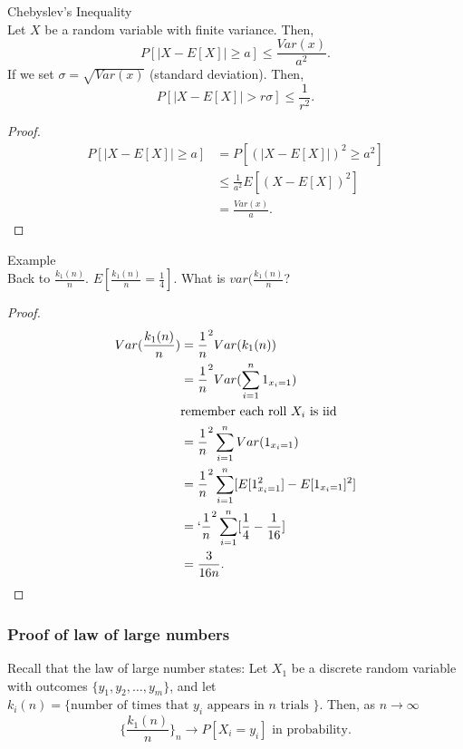 \documentclass[a4paper]{article}
\begin{document}
\begin{theorem}{Chebyslev's Inequality} \\
  Let $X$ be a random variable with finite variance. Then,
   \[
     P[|X - E[X]| \geq a] \leq \frac{Var(x)}{a^{2}} 
  .\] 
  If we set $\sigma = \sqrt{Var(x)} $ (standard deviation). Then,
  \[
    P[|X - E[X]| > r \sigma] \leq \frac{1}{r^{2}} 
  .\]

  \begin{proof}
    \begin{align*}
      P[|X - E[X]| \geq a] &= P[(|X- E[X]|)^{2} \geq a^{2}] \\
                           &\leq \frac{1}{a^{2}} E[(X - E[X])^{2}] \\
                           &=\frac{Var(x)}{a}
    .\end{align*}
  \end{proof}
\end{theorem}

\begin{note}{Example}\\
  Back to $\frac{k_1(n)}{n}$. $E[\frac{k_1(n)}{n} = \frac{1}{4}]$. What is $var(\frac{k_1(n)}{n}$?
  \begin{proof}
    \begin{align*}
      Var(\frac{k_1(n)}{n}) &= \frac{1}{n}^{2} Var(k_1(n)) \\
                            &= \frac{1}{n}^{2} Var(\sum_{i=1}^{n} 1_{x_i = 1}) \\
                            &\text{remember each roll $X_i$ is iid} \\
                            &= \frac{1}{n}^{2} \sum_{i=1}^{n} Var(1_{x_i=1}) \\
                            &= \frac{1}{n}^{2} \sum_{i=1}^{n} [E[1_{x_i=1}^{2}] - E[1_{x_i=1}]^{2}] \\
                            &=`\frac{1}{n}^{2} \sum_{i=1}^{n} [\frac{1}{4} - \frac{1}{16}] \\
                            &= \frac{3}{16n}
    .\end{align*}
  \end{proof}
\end{note}

\subsubsection{Proof of law of large numbers}
Recall that the law of large number states:
  Let $X_1$ be a discrete random variable with outcomes  $\{y_1, y_2, \ldots, y_m\} $, and let $k_i(n) = \{\text{number of times that $y_i$ appears in $n$ trials }\} $. Then, as $n \to \infty$
  \[
    \{\frac{k_1(n)}{n}\}_{n}  \to P[X_i = y_i] \text{  in probability} 
  .\] 
\end{document}
